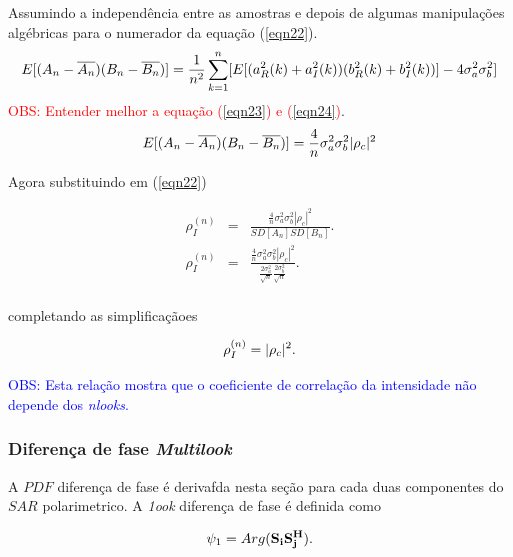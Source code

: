 \documentclass[12pt,a4paper]{article}
\begin{document}
Assumindo a independência entre as amostras e depois de algumas manipulações algébricas para o numerador da equação (\ref{eqn22}). 
\begin{equation}\label{eqn23}
	E[(A_n-\overline{A_n})(B_n-\overline{B_n})]=\frac{1}{n^2}\sum_{k=1}^{n}[E[(a_{R}^2(k)+a_{I}^2(k))(b_{R}^2(k)+b_{I}^2(k))]-4\sigma_a^2\sigma_b^2] \\
\end{equation}
\textcolor{red}{OBS: Entender melhor a equação (\ref{eqn23}) e (\ref{eqn24})}.
\begin{equation}\label{eqn24}
	E[(A_n-\overline{A_n})(B_n-\overline{B_n})]=\frac{4}{n}\sigma_a^2\sigma_b^2|\rho_c|^2\\
\end{equation}

Agora substituindo em (\ref{eqn22})

\begin{equation}\label{eqn25}
\begin{array}{ccc}
	\rho_I^{(n)}&=&\frac{\frac{4}{n}\sigma_a^2\sigma_b^2|\rho_c|^2}{SD[A_n]SD[B_n]}. \\
	\rho_I^{(n)}&=&\frac{\frac{4}{n}\sigma_a^2\sigma_b^2|\rho_c|^2}{\frac{2\sigma_a^2}{\sqrt{n}}\frac{2\sigma_b^2}{\sqrt{n}}}. \\
\end{array}
\end{equation}

completando as simplificaçãoes

\begin{equation}\label{eqn26}
	\rho_I^{(n)}=|\rho_c|^2. \\
\end{equation}

\textcolor{blue}{OBS: Esta relação mostra que o coeficiente de correlação da intensidade não depende dos {\it nlooks}.}

\subsubsection{Diferença de fase {\it Multilook}}

A $PDF$ diferença de fase é derivafda nesta seção para cada duas componentes do $SAR$ polarimetrico. A {\it 1ook} diferença de fase é definida como 


\begin{equation}\label{eqn27}
	\psi_1=Arg(\mathbf{S_iS_j^{H}}). \\
\end{equation}
\end{document}
